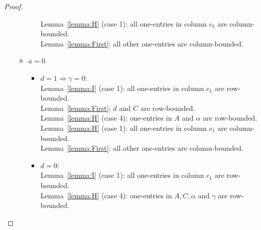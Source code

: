 \begin{proof}
\begin{itemize}
\begin{itemize}
\begin{itemize}
					Lemma~\ref{lemma:H} (case 1): all one-entries in column $c_1$ are column-bounded.\\
					Lemma~\ref{lemma:First}: all other one-entries are column-bounded.
			\end{itemize}
		\item $a=0$
			\begin{itemize}
				\item $d=1\Rightarrow\gamma=0$:\\
					Lemma~\ref{lemma:I} (case 1): all one-entries in column $c_1$ are row-bounded.\\
					Lemma~\ref{lemma:First}: $d$ and $C$ are row-bounded.\\
					Lemma~\ref{lemma:H} (case 4): one-entries in $A$ and $\alpha$ are row-bounded.\\
					
					Lemma~\ref{lemma:H} (case 1): all one-entries in column $c_1$ are column-bounded.\\
					Lemma~\ref{lemma:First}: all other one-entries are column-bounded.
				\item $d=0$:\\
					Lemma~\ref{lemma:I} (case 1): all one-entries in column $c_1$ are row-bounded.\\
					Lemma~\ref{lemma:H} (case 4): one-entries in $A,C,\alpha$ and $\gamma$ are row-bounded.\\
					

\end{itemize}
\end{itemize}
\end{itemize}
\end{proof}
